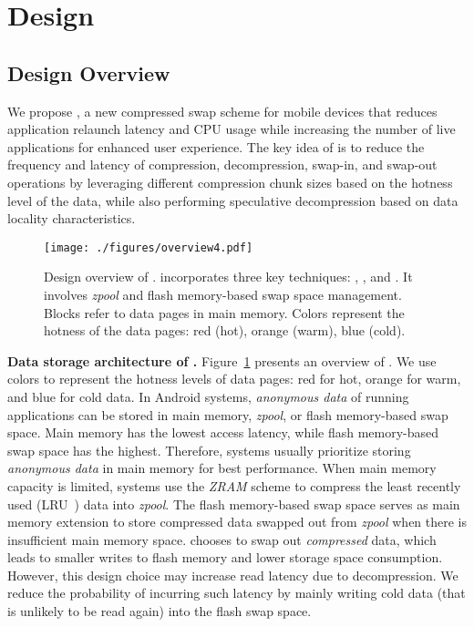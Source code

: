 \section{\proposal Design}
\label{sec:mechanisim}


\subsection{Design Overview}
We propose \proposal, a new compressed swap scheme for mobile devices that reduces application relaunch latency and CPU usage while increasing the number of live applications for enhanced user experience.
The key idea of \proposal is to reduce the frequency and latency of compression, decompression, swap-in, and swap-out operations by leveraging different compression chunk sizes based on the hotness level of the data, while also performing speculative decompression based on data locality characteristics.

\begin{figure}[!h]
\centering
\vspace{-3pt}
\texttt{[image: ./figures/overview4.pdf]}
\caption{Design overview of \proposal. \proposal incorporates three key techniques: \dataorg, \compress, and \predi. It involves  \emph{zpool} and flash memory-based swap space management. Blocks refer to data pages in main memory. Colors represent the hotness of the data
pages: red (hot), orange (warm), blue (cold).}
\label{fig:overview}
\end{figure}

\noindent\textbf{Data storage architecture of \proposal.} Figure~\ref{fig:overview} presents an overview of \proposal. We use colors to represent the hotness levels of data pages: red for hot, orange for warm, and blue for cold data. In Android systems, \emph{anonymous data} of running applications can be stored in main memory,  \emph{zpool}, or flash memory-based swap space. Main memory has the lowest access latency, while flash memory-based swap space has the highest. Therefore, systems usually prioritize storing \emph{anonymous data} in main memory for best performance. When main memory capacity is limited, systems use the  \emph{ZRAM} scheme to compress the least recently used (LRU~\cite{LRU}) data into  \emph{zpool}. 
The flash memory-based swap space serves as main memory extension to store compressed data swapped out from  \emph{zpool} when there is insufficient main memory space. \proposal chooses to swap out \emph{compressed} data,  which leads to smaller writes to flash memory and lower storage space consumption.  However, this design choice may increase read latency due to decompression. 
We reduce the probability of incurring such latency by mainly writing cold data (that is unlikely to be read again) into the flash swap space. 

